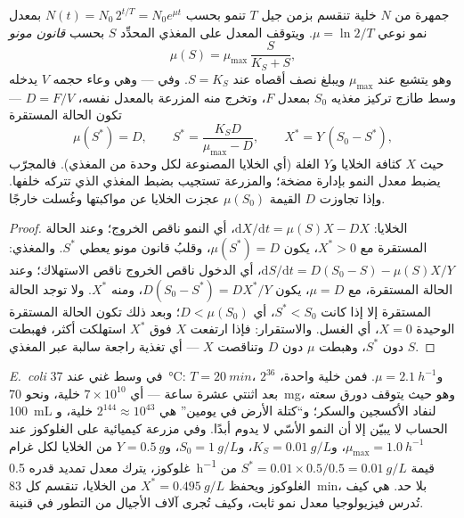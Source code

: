 \begin{theorem}\label{thm:b3:bacteriology:monod}
جمهرة من $N$ خلية تنقسم بزمن جيل $T$ تنمو بحسب
$N(t) = N_{0}\,2^{t/T} = N_{0}e^{\mu t}$ بمعدل نمو نوعي $\mu =
\ln 2/T$. ويتوقف المعدل على المغذي المحدِّد $S$ بحسب
\emph{قانون مونو}
\[
\mu(S) = \mu_{\max}\,\frac{S}{K_{S} + S},
\]
وهو يتشبع عند $\mu_{\max}$ ويبلغ نصف أقصاه عند $S = K_{S}$. وفي
\emph{} --- وهي وعاء حجمه $V$ يدخله وسط طازج
تركيز مغذيه $S_{0}$ بمعدل $F$، وتخرج منه
المزرعة بالمعدل نفسه،  $D = F/V$ ---
تكون الحالة المستقرة
\[
\mu(S^{*}) = D,\qquad S^{*} = \frac{K_{S}D}{\mu_{\max} - D},\qquad
X^{*} = Y\,(S_{0} - S^{*}),
\]
حيث $X$ كثافة الخلايا و$Y$ الغلة (أي الخلايا المصنوعة لكل وحدة من
المغذي). فالمجرّب يضبط معدل النمو بإدارة مضخة؛
والمزرعة تستجيب بضبط المغذي الذي تتركه خلفها. وإذا تجاوزت $D$
القيمة $\mu(S_{0})$ عجزت الخلايا عن مواكبتها وغُسلت خارجًا.
\end{theorem}
\begin{proof}
الخلايا: $\mathrm{d}X/\mathrm{d}t = \mu(S)X - DX$، أي النمو ناقص الخروج؛
وعند الحالة المستقرة مع $X^{*} > 0$، يكون $\mu(S^{*}) = D$، وقلبُ
قانون مونو يعطي $S^{*}$. والمغذي: $\mathrm{d}S/\mathrm{d}t = D(S_{0} -
S) - \mu(S)X/Y$، أي الدخول ناقص الخروج ناقص الاستهلاك؛ وعند الحالة
المستقرة، مع $\mu = D$، يكون $D(S_{0} - S^{*}) = DX^{*}/Y$، ومنه $X^{*}$.
ولا توجد الحالة المستقرة إلا إذا كانت $S^{*} < S_{0}$، أي $D <
\mu(S_{0})$؛ وبعد ذلك تكون الحالة المستقرة الوحيدة $X = 0$، أي الغسل.
والاستقرار: فإذا ارتفعت $X$ فوق $X^{*}$ استهلكت أكثر، فهبطت $S$ دون
$S^{*}$، وهبطت $\mu$ دون $D$ وتناقصت $X$ --- أي تغذية راجعة سالبة
عبر المغذي.
\end{proof}

\begin{example}\label{ex:b3:bacteriology:numbers}
\emph{E.~coli} في وسط غني عند \qty{37}{\celsius}: $T = \qty{20}{min}$،
و$\mu = \qty{2.1}{h^{-1}}$. فمن خلية واحدة، $2^{36}$ بعد اثنتي عشرة ساعة
--- أي $7\times 10^{10}$ خلية، ونحو \qty{70}{mg}، وهو حيث يتوقف دورق
سعته \qty{100}{mL} لنفاد الأكسجين والسكر؛ و``كتلة
الأرض في يومين'' هي $2^{144}\approx 10^{43}$ خلية، و
الحساب لا يبيّن إلا أن النمو الأسّي لا يدوم أبدًا. وفي
مزرعة كيميائية على الغلوكوز عند $\mu_{\max} = \qty{1.0}{h^{-1}}$، و$K_{S} =
\qty{0.01}{g/L}$، و$S_{0} = \qty{1}{g/L}$، و$Y = \qty{0.5}{g}$ من الخلايا
لكل غرام غلوكوز، يترك معدل تمديد قدره \qty{0.5}{h^{-1}} قيمة $S^{*}
= 0.01\times 0.5/0.5 = \qty{0.01}{g/L}$ من الغلوكوز ويحفظ $X^{*} =
\qty{0.495}{g/L}$ من الخلايا، تنقسم كل \qty{83}{min}، بلا حد.
 هي كيف تُدرس فيزيولوجيا معدل نمو ثابت،
وكيف تُجرى آلاف الأجيال من التطور في قنينة.
\end{example}

